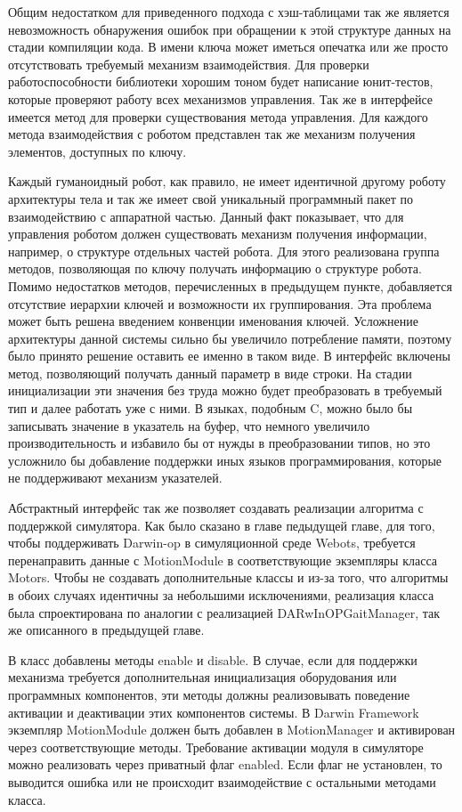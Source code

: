 Общим недостатком для приведенного подхода с хэш-таблицами так же является невозможность обнаружения ошибок при обращении к этой структуре данных на стадии компиляции кода. В имени ключа может иметься опечатка или же просто отсутствовать требуемый механизм взаимодействия. Для проверки работоспособности библиотеки хорошим тоном будет написание юнит-тестов, которые проверяют работу всех механизмов управления. Так же в интерфейсе имеется метод для проверки существования метода управления. Для каждого метода взаимодействия с роботом представлен так же механизм получения элементов, доступных по ключу.

Каждый гуманоидный робот, как правило, не имеет идентичной другому роботу архитектуры тела и так же имеет свой уникальный программный пакет по взаимодействию с аппаратной частью. Данный факт показывает, что для управления роботом должен существовать механизм получения информации, например, о структуре отдельных частей робота. Для этого реализована группа методов, позволяющая по ключу получать информацию о структуре робота. Помимо недостатков методов, перечисленных в предыдущем пункте, добавляется отсутствие иерархии ключей и возможности их группирования. Эта проблема может быть решена введением конвенции именования ключей. Усложнение архитектуры данной системы сильно бы увеличило потребление памяти, поэтому было принято решение оставить ее именно в таком виде. В интерфейс включены метод, позволяющий получать данный параметр в виде строки. На стадии инициализации эти значения без труда можно будет преобразовать в требуемый тип и далее работать уже с ними. В языках, подобным C, можно было бы записывать значение в указатель на буфер, что немного увеличило производительность и избавило бы от нужды в преобразовании типов, но это усложнило бы добавление поддержки иных языков программирования, которые не поддерживают механизм указателей.

Абстрактный интерфейс так же позволяет создавать реализации алгоритма с поддержкой симулятора. Как было сказано в главе педыдущей главе, для того, чтобы поддерживать Darwin-op в симуляционной среде Webots, требуется перенаправить данные с MotionModule в соответствующие экземпляры класса Motors. Чтобы не создавать дополнительные классы и из-за того, что алгоритмы в обоих случаях идентичны за небольшими исключениями, реализация класса была спроектирована по аналогии с реализацией DARwInOPGaitManager, так же описанного в предыдущей главе.

В класс добавлены методы enable и disable. В случае, если для поддержки механизма требуется дополнительная инициализация оборудования или программных компонентов, эти методы должны реализовывать поведение активации и деактивации этих компонентов системы. В Darwin Framework экземпляр MotionModule должен быть добавлен в MotionManager и активирован через соответствующие методы. Требование активации модуля в симуляторе можно реализовать через приватный флаг enabled. Если флаг не установлен, то выводится ошибка или не происходит взаимодействие с остальными методами класса.

